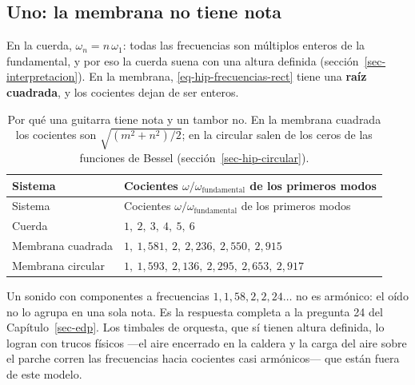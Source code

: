 \documentclass[
  spanish,
  a4paper,
]{scrbook}
\theoremstyle{definition}
\theoremstyle{plain}
\theoremstyle{definition}
\theoremstyle{plain}
\theoremstyle{definition}
\theoremstyle{remark}
\begin{document}
\subsection{Uno: la membrana no tiene nota}\label{sec-hip-sin-nota}

En la cuerda, \(\omega_n = n\,\omega_1\): todas las frecuencias son
múltiplos enteros de la fundamental, y por eso la cuerda suena con una
altura definida (sección~\ref{sec-interpretacion}). En la membrana,
\ref{eq-hip-frecuencias-rect} tiene una \textbf{raíz cuadrada}, y los
cocientes dejan de ser enteros.

\begin{longtable}[]{@{}
  >{\raggedright\arraybackslash}p{}
  >{\raggedright\arraybackslash}p{}@{}}
\caption{Por qué una guitarra tiene nota y un tambor no. En la membrana
cuadrada los cocientes son \(\sqrt{(m^2+n^2)/2}\); en la circular salen
de los ceros de las funciones de Bessel
(sección~\ref{sec-hip-circular}).}\label{tbl-hip-cocientes}\tabularnewline
\toprule\noalign{}
\begin{minipage}[b]{\linewidth}\raggedright
Sistema
\end{minipage} & \begin{minipage}[b]{\linewidth}\raggedright
Cocientes \(\omega/\omega_{\text{fundamental}}\) de los primeros modos
\end{minipage} \\
\midrule\noalign{}
\endfirsthead
\toprule\noalign{}
\begin{minipage}[b]{\linewidth}\raggedright
Sistema
\end{minipage} & \begin{minipage}[b]{\linewidth}\raggedright
Cocientes \(\omega/\omega_{\text{fundamental}}\) de los primeros modos
\end{minipage} \\
\midrule\noalign{}
\endhead
\bottomrule\noalign{}
\endlastfoot
Cuerda & \(1,\ 2,\ 3,\ 4,\ 5,\ 6\) \\
Membrana cuadrada & \(1,\ 1{,}581,\ 2,\ 2{,}236,\ 2{,}550,\ 2{,}915\) \\
Membrana circular &
\(1,\ 1{,}593,\ 2{,}136,\ 2{,}295,\ 2{,}653,\ 2{,}917\) \\
\end{longtable}

Un sonido con componentes a frecuencias \(1, 1{,}58, 2, 2{,}24\dots\) no
es armónico: el oído no lo agrupa en una sola nota. Es la respuesta
completa a la pregunta 24 del Capítulo~\ref{sec-edp}. Los timbales de
orquesta, que sí tienen altura definida, lo logran con trucos físicos
---el aire encerrado en la caldera y la carga del aire sobre el parche
corren las frecuencias hacia cocientes casi armónicos--- que están fuera
de este modelo.
\end{document}
